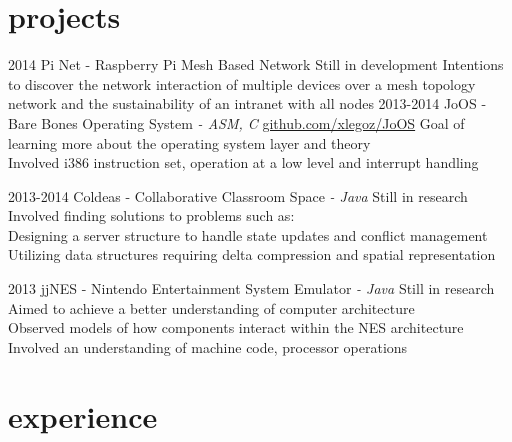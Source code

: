 \documentclass[]{friggeri-cv}
\begin{document}
\section{projects}

\begin{entrylist}
  \entry
  	{2014}
  	{Pi Net \textsf{- Raspberry Pi Mesh Based Network}}
  	{Still in development}
  	{Intentions to discover the network interaction of multiple devices over a mesh topology network and the sustainability of an intranet with all nodes}
  \entry
    {2013-2014}
    {JoOS \textsf{- Bare Bones Operating System \em{- ASM, C}}}
    {\href{http://github.com/xlegoz/JoOS}{github.com/xlegoz/JoOS}}
    {Goal of learning more about the operating system layer and theory \\
    Involved i386 instruction set, operation at a low level and interrupt handling}
    
  \entry
  	{2013-2014}
  	{Coldeas \textsf{- Collaborative Classroom Space \em{- Java}}}
  	{Still in research}
  	{Involved finding solutions to problems such as: \\
	Designing a server structure to handle state updates and conflict management \\
  	Utilizing data structures requiring delta compression and spatial representation}
 
  \entry
  	{2013}
  	{jjNES \textsf{- Nintendo Entertainment System Emulator \em{- Java}}}
  	{Still in research}
  	{Aimed to achieve a better understanding of computer architecture \\
  	Observed models of how components interact within the NES architecture \\
  	Involved an understanding of machine code, processor operations}
  	 
  
\end{entrylist}



\section{experience}
\end{document}
